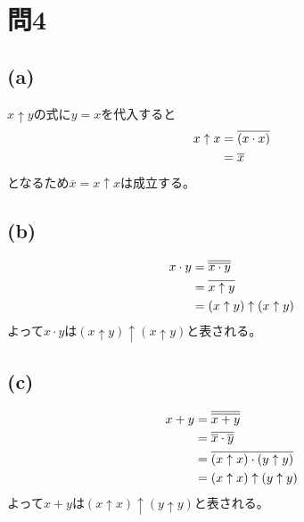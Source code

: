 \documentclass{jsarticle}
\begin{document}
  \section{問4}
    \subsection{(a)}
    $x \uparrow y$の式に$y = x$を代入すると
    \begin{align}
      x \uparrow x &= \overline{(x \cdot x)} \notag \\
                   &= \overline{x}
    \end{align}
    となるため$\overline{x} = x \uparrow x$は成立する。

    \subsection{(b)}
    \begin{align}
      x \cdot y &= \overline{\overline{x \cdot y}} \notag \\
                &= \overline{x \uparrow y} \notag \\
                &= (x \uparrow y) \uparrow (x \uparrow y)
    \end{align}
    よって$x \cdot y$は$(x \uparrow y) \uparrow (x \uparrow y)$と表される。

    \subsection{(c)}
    \begin{align}
      x + y &= \overline{\overline{x + y}} \notag \\
            &= \overline{\overline{x} \cdot \overline{y}} \notag \\
            &= \overline{(x \uparrow x) \cdot (y \uparrow y)} \notag \\
            &= (x \uparrow x) \uparrow (y \uparrow y)
    \end{align}
    よって$x + y$は$(x \uparrow x) \uparrow (y \uparrow y)$と表される。
\end{document}
